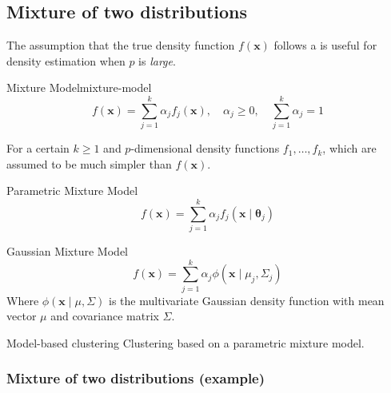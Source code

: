 \subsection{Mixture of two distributions}

The assumption that the true density function $f(\boldsymbol{x})$ follows
a  is useful for density estimation when $p$ is \emph{large}.

\begin{definition}{Mixture Model}{mixture-model}
	\begin{equation*}
		f(\boldsymbol{x}) = \sum_{j=1}^k \alpha_j f_j(\boldsymbol{x}),\quad \alpha_j \geq 0,\quad \sum_{j=1}^k \alpha_j = 1
	\end{equation*}

	For a certain $k \geq 1$ and $p$-dimensional density functions $f_1, \dots, f_k$,
	which are assumed to be much simpler than $f(\boldsymbol{x})$.
\end{definition}

\begin{definition}{Parametric Mixture Model}{}
	\begin{equation*}
		f(\boldsymbol{x}) = \sum_{j=1}^k \alpha_j f_j(\boldsymbol{x}\mid\boldsymbol{\theta}_j)
	\end{equation*}
\end{definition}

\begin{example}{Gaussian Mixture Model}{}
	\begin{equation*}
		f(\boldsymbol{x}) = \sum_{j=1}^k \alpha_j \phi(\boldsymbol{x}\mid \mu_j, \Sigma_j)
	\end{equation*}
	Where $\phi(\boldsymbol{x}\mid \mu, \Sigma)$ is the multivariate Gaussian density function
	with mean vector $\mu$ and covariance matrix $\Sigma$.
\end{example}

\begin{definition}{Model-based clustering}{}
	Clustering based on a parametric mixture model.
\end{definition}

\subsubsection{Mixture of two distributions (example)}

